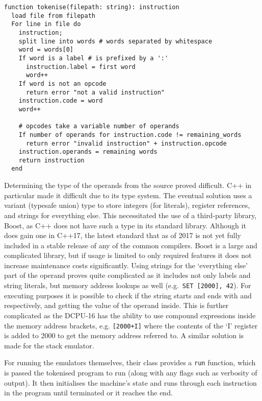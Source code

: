 \noindent\begin{minipage}{\linewidth}
\begin{lstlisting}[caption={Tokenising algorithm for the DCPU-16}]
function tokenise(filepath: string): instruction
  load file from filepath
  For line in file do
    instruction;
    split line into words # words separated by whitespace
    word = words[0]
    If word is a label # is prefixed by a ':'
      instruction.label = first word
      word++
    If word is not an opcode
      return error "not a valid instruction"
    instruction.code = word
    word++

    # opcodes take a variable number of operands
    If number of operands for instruction.code != remaining_words
      return error "invalid instruction" + instruction.opcode
    instruction.operands = remaining words
    return instruction
  end
\end{lstlisting}
\end{minipage}

Determining the type of the operands from the source proved difficult.
C++ in particular made it difficult due to its type system. The eventual
solution uses a variant (typesafe union) type to store integers (for
literals), register references, and strings for everything else. This
necessitated the use of a third-party library, Boost, as C++ does not have such
a type in its standard library. Although it does gain one in C++17, the latest
standard that as of 2017 is not yet fully included in a stable release of any of
the common compilers. Boost is a large and complicated library, but if usage is
limited to only required features it does not increase maintenance costs
significantly. Using strings for the `everything else' part of the operand
proves quite complicated as it includes not only labels and string
literals, but memory address lookups as well (e.g.\ \texttt{SET [2000], 42}).
For executing purposes it is possible to check if the string starts and ends
with \texttt{\lbrack} and \texttt{\rbrack} respectively, and getting the value
of the operand inside. This is further complicated as the DCPU-16 has the
ability to use compound expressions inside the memory address brackets, e.g.
\texttt{[2000+I]} where the contents of the `I' register is added to 2000 to
get the memory address referred to. A similar solution is made for the stack
emulator.

For running the emulators themselves, their class provides a \texttt{run}
function, which is passed the tokenised program to run (along with any flags
such as verbosity of output). It then initialises the machine's state and runs
through each instruction in the program until terminated or it reaches the end.

